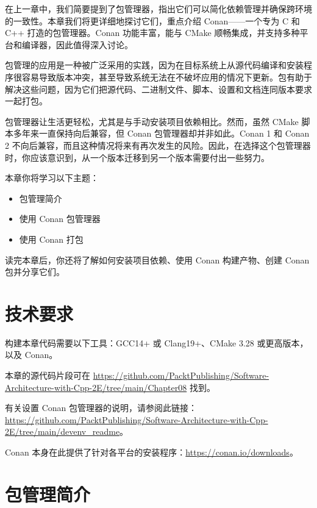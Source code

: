 在上一章中，我们简要提到了包管理器，指出它们可以简化依赖管理并确保跨环境的一致性。本章我们将更详细地探讨它们，重点介绍 Conan——一个专为 C 和 C++ 打造的包管理器。Conan 功能丰富，能与 CMake 顺畅集成，并支持多种平台和编译器，因此值得深入讨论。

包管理的应用是一种被广泛采用的实践，因为在目标系统上从源代码编译和安装程序很容易导致版本冲突，甚至导致系统无法在不破坏应用的情况下更新。包有助于解决这些问题，因为它们把源代码、二进制文件、脚本、设置和文档连同版本要求一起打包。

包管理器让生活更轻松，尤其是与手动安装项目依赖相比。然而，虽然 CMake 脚本多年来一直保持向后兼容，但 Conan 包管理器却并非如此。Conan 1 和 Conan 2 不向后兼容，而且这种情况将来有再次发生的风险。因此，在选择这个包管理器时，你应该意识到，从一个版本迁移到另一个版本需要付出一些努力。

本章你将学习以下主题：

\begin{itemize}
\item 包管理简介
\item 使用 Conan 包管理器
\item 使用 Conan 打包
\end{itemize}

读完本章后，你还将了解如何安装项目依赖、使用 Conan 构建产物、创建 Conan 包并分享它们。

\section{技术要求}

构建本章代码需要以下工具：GCC14+ 或 Clang19+、CMake 3.28 或更高版本，以及 Conan。

本章的源代码片段可在 \href{https://github.com/PacktPublishing/Software-Architecture-with-Cpp-2E/tree/main/Chapter08}{https://github.com/PacktPublishing/Software-Architecture-with-Cpp-2E/tree/main/Chapter08} 找到。

有关设置 Conan 包管理器的说明，请参阅此链接：\href{https://github.com/PacktPublishing/Software-Architecture-with-Cpp-2E/tree/main/devenv_readme}{https://github.com/PacktPublishing/Software-Architecture-with-Cpp-2E/tree/main/devenv\_readme}。

Conan 本身在此提供了针对各平台的安装程序：\href{https://conan.io/downloads}{https://conan.io/downloads}。

\section{包管理简介}

